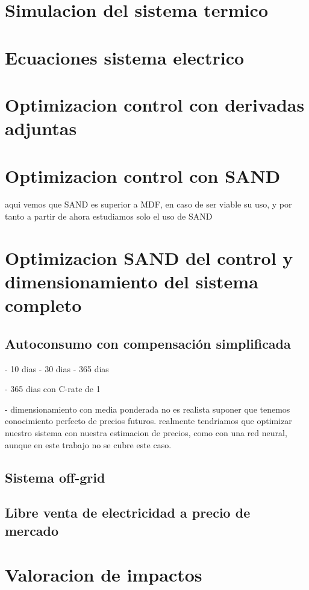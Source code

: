 \section{Simulacion del sistema termico}

\section{Ecuaciones sistema electrico}

\section{Optimizacion control con derivadas adjuntas}

\section{Optimizacion control con SAND}

aqui vemos que SAND es superior a MDF, en caso de ser viable su uso,
y por tanto a partir de ahora estudiamos solo el uso de SAND

\section{Optimizacion SAND del control y dimensionamiento del sistema completo}
\subsection{Autoconsumo con compensación simplificada}
- 10 dias
- 30 dias
- 365 dias

- 365 dias con C-rate de 1

- dimensionamiento con media ponderada
no es realista suponer que tenemos conocimiento perfecto de precios futuros.
realmente tendriamos que optimizar nuestro sistema con nuestra estimacion
de precios, como con una red neural, aunque en este trabajo no se cubre este caso.

\subsection{Sistema off-grid}

\subsection{Libre venta de electricidad a precio de mercado}

\section{Valoracion de impactos}
